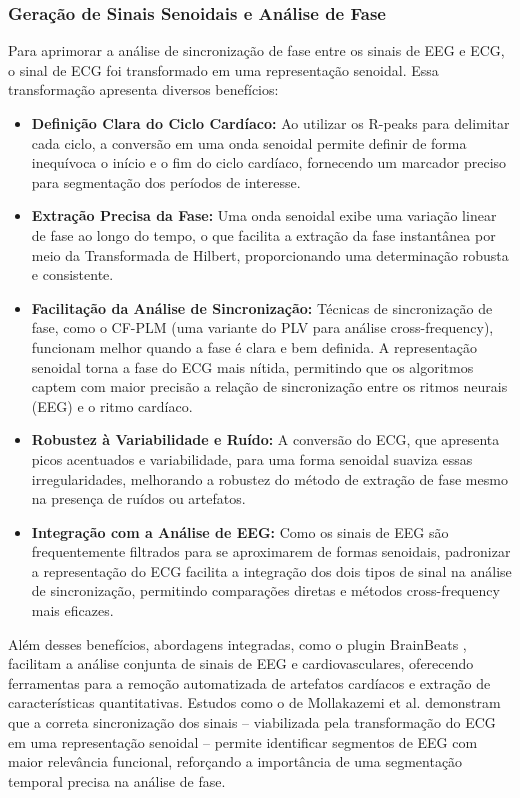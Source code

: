 \subsubsection{Geração de Sinais Senoidais e Análise de Fase}

Para aprimorar a análise de sincronização de fase entre os sinais de EEG e ECG, o sinal de ECG foi transformado em uma representação senoidal. Essa transformação apresenta diversos benefícios:
\begin{itemize}
    \item \textbf{Definição Clara do Ciclo Cardíaco:} Ao utilizar os R-peaks para delimitar cada ciclo, a conversão em uma onda senoidal permite definir de forma inequívoca o início e o fim do ciclo cardíaco, fornecendo um marcador preciso para segmentação dos períodos de interesse.
    \item \textbf{Extração Precisa da Fase:} Uma onda senoidal exibe uma variação linear de fase ao longo do tempo, o que facilita a extração da fase instantânea por meio da Transformada de Hilbert, proporcionando uma determinação robusta e consistente.
    \item \textbf{Facilitação da Análise de Sincronização:} Técnicas de sincronização de fase, como o CF-PLM (uma variante do PLV para análise cross-frequency), funcionam melhor quando a fase é clara e bem definida. A representação senoidal torna a fase do ECG mais nítida, permitindo que os algoritmos captem com maior precisão a relação de sincronização entre os ritmos neurais (EEG) e o ritmo cardíaco.
    \item \textbf{Robustez à Variabilidade e Ruído:} A conversão do ECG, que apresenta picos acentuados e variabilidade, para uma forma senoidal suaviza essas irregularidades, melhorando a robustez do método de extração de fase mesmo na presença de ruídos ou artefatos.
    \item \textbf{Integração com a Análise de EEG:} Como os sinais de EEG são frequentemente filtrados para se aproximarem de formas senoidais, padronizar a representação do ECG facilita a integração dos dois tipos de sinal na análise de sincronização, permitindo comparações diretas e métodos cross-frequency mais eficazes.
\end{itemize}

Além desses benefícios, abordagens integradas, como o plugin BrainBeats \cite{cannard2023brainbeats}, facilitam a análise conjunta de sinais de EEG e cardiovasculares, oferecendo ferramentas para a remoção automatizada de artefatos cardíacos e extração de características quantitativas. Estudos como o de Mollakazemi et al. \cite{mollakazemi2021eeg} demonstram que a correta sincronização dos sinais – viabilizada pela transformação do ECG em uma representação senoidal – permite identificar segmentos de EEG com maior relevância funcional, reforçando a importância de uma segmentação temporal precisa na análise de fase.

